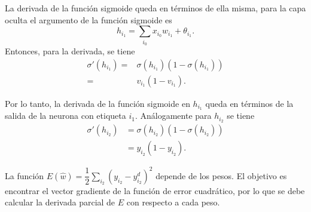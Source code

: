 \documentclass[11pt,letterpaper]{article}
\theoremstyle{definition}
\theoremstyle{definition}
\theoremstyle{definition}
\theoremstyle{definition}
\theoremstyle{definition}
\theoremstyle{definition}
\theoremstyle{definition}
\theoremstyle{definition}
\begin{document}
La derivada de la función sigmoide queda en términos de ella misma, para la capa oculta el argumento de la función sigmoide es 
\[ h_{i_1} =\displaystyle\sum_{i_0} x_{i_0} w_{i_1}+\theta_{i_1}. \]
Entonces, para la derivada, se tiene 
\begin{align}\label{dersig1}
	\sigma'(h_{i_1})=&\sigma(h_{i_1})(1-\sigma(h_{i_1}))\nonumber\\
	=&v_{i_1} (1-v_{i_1}).
\end{align}

Por lo tanto, la derivada de la función sigmoide en $ h_{i_1} $ queda en términos de la salida de la neurona con etiqueta $ i_1 $. Análogamente para $ h_{i_2} $ se tiene
\begin{align}\label{dersig2}
	\sigma'(h_{i_2})&=\sigma(h_{i_2})(1-\sigma(h_{i_2}))\nonumber\\
	&=y_{i_2} (1-y_{i_2}).
\end{align}

La funci\'on $ E(\hat{w})=\dfrac{1}{2}\displaystyle\sum_{i_2} (y_{i_2}-y_{i_2}^d)^2 $ depende de los pesos. El objetivo es encontrar el vector gradiente de la función de error cuadrático, por lo que se debe calcular la derivada parcial de $ E $ con respecto a cada peso.
\end{document}
